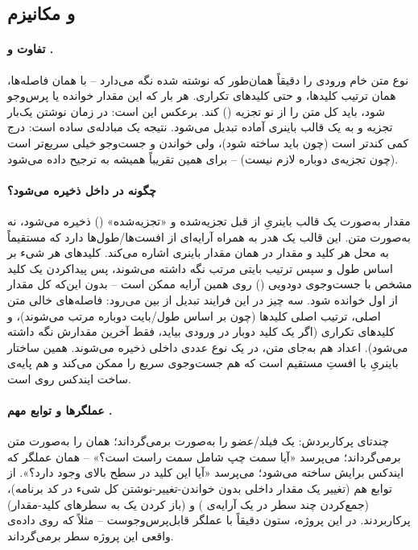 \subsection{ و مکانیزم }

\paragraph{تفاوت  و .} نوع  متن خام ورودی را دقیقاً همان‌طور که نوشته شده نگه می‌دارد -- با همان فاصله‌ها، همان ترتیب کلیدها، و حتی کلیدهای تکراری. هر بار که این مقدار خوانده یا پرس‌وجو شود،  باید کل متن را از نو تجزیه () کند.  برعکس این است: در زمان نوشتن یک‌بار تجزیه و به یک قالب باینری آماده تبدیل می‌شود. نتیجه یک مبادله‌ی ساده است: درج  کمی کندتر است (چون باید ساخته شود)، ولی خواندن و جست‌وجو خیلی سریع‌تر است (چون تجزیه‌ی دوباره لازم نیست) -- برای همین تقریباً همیشه  به  ترجیح داده می‌شود.

\paragraph{ چگونه در داخل  ذخیره می‌شود؟} مقدار  به‌صورت یک قالب باینریِ از قبل تجزیه‌شده و «تجزیه‌شده» () ذخیره می‌شود، نه به‌صورت متن. این قالب یک هدر به همراه آرایه‌ای از افست‌ها/طول‌ها دارد که مستقیماً به محل هر کلید و مقدار در همان مقدار باینری اشاره می‌کند. کلیدهای هر شیء بر اساس طول و سپس ترتیب بایتی مرتب نگه داشته می‌شوند، پس پیداکردن یک کلید مشخص با جست‌وجوی دودویی () روی همین آرایه ممکن است -- بدون این‌که کل مقدار از اول خوانده شود. سه چیز در این فرایند تبدیل از بین می‌رود: فاصله‌های خالی متن اصلی، ترتیب اصلی کلیدها (چون بر اساس طول/بایت دوباره مرتب می‌شوند)، و کلیدهای تکراری (اگر یک کلید دوبار در ورودی بیاید، فقط آخرین مقدارش نگه داشته می‌شود). اعداد هم به‌جای متن، در یک نوع عددی داخلی ذخیره می‌شوند. همین ساختار باینریِ با افستِ مستقیم است که هم جست‌وجوی سریع را ممکن می‌کند و هم پایه‌ی ساخت ایندکس  روی  است.

\paragraph{عملگرها و توابع مهم .} چندتای پرکاربردش: \lr{->} یک فیلد/عضو را به‌صورت  برمی‌گرداند؛ \lr{->>} همان را به‌صورت متن برمی‌گرداند؛  می‌پرسد «آیا سمت چپ شامل سمت راست است؟» -- همان عملگر  که ایندکس  برایش ساخته می‌شود؛  می‌پرسد «آیا این کلید در سطح بالای  وجود دارد؟». از توابع هم  (تغییر یک مقدار داخلی بدون خواندن-تغییر-نوشتن کل شیء در کد برنامه)،  (جمع‌کردن چند سطر در یک آرایه‌ی ) و  (باز کردن یک  به سطرهای کلید-مقدار) پرکاربردند. در این پروژه، ستون  دقیقاً با عملگر  قابل‌پرس‌وجوست -- مثلاً  که روی داده‌ی واقعی این پروژه  سطر برمی‌گرداند.

